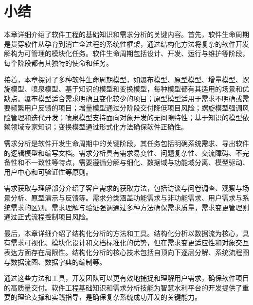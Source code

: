 \section{小结}

本章详细介绍了软件工程的基础知识和需求分析的关键内容。首先，软件生命周期是贯穿软件从孕育到消亡全过程的系统性框架，通过结构化方法将复杂的软件开发解构为可管理的模块化任务。软件生命周期包括设计、开发、运行与维护等阶段，每个阶段都有其独特的使命和任务。

接着，本章探讨了多种软件生命周期模型，如瀑布模型、原型模型、增量模型、螺旋模型、喷泉模型、基于知识的模型和变换模型，每种模型都有其适用的场景和优缺点。瀑布模型适合需求明确且变化较少的项目；原型模型适用于需求不明确或需要频繁用户反馈的项目；增量模型通过分阶段交付降低项目风险；螺旋模型强调风险管理和迭代开发；喷泉模型支持面向对象开发的无间隙特性；基于知识的模型依赖领域专家知识；变换模型通过形式化方法确保软件正确性。

需求分析是软件开发生命周期中的关键阶段，其任务包括明确系统需求、导出软件的逻辑模型和编写文档。需求分析具有需求易变性、问题复杂性、交流障碍、不完备性和不一致性等特点，需要遵循分解与细化、数据域与功能域分离、模型驱动、用户中心和可验证性等原则。

需求获取与理解部分介绍了客户需求的获取方法，包括访谈与问卷调查、观察与场景分析、原型演示与反馈等。需求分类涵盖功能需求与非功能需求、用户需求与系统需求的区别。需求理解与验证强调通过多种方法确保需求质量，需求变更管理则通过正式流程控制项目风险。

最后，本章详细介绍了结构化分析的方法和工具。结构化分析以数据流为核心，具有需求可视化、模块化设计和文档标准化的优势，但在需求变更适应性和对象交互表达方面存在局限性。结构化分析的核心技术包括自顶向下逐层分解、系统流程图与数据流图、数据字典的编制等。

通过这些方法和工具，开发团队可以更有效地捕捉和理解用户需求，确保软件项目的高质量交付。软件工程基础知识和需求分析技能为智慧水利平台的开发提供了重要的理论支撑和实践指导，是确保复杂系统成功开发的关键能力。

